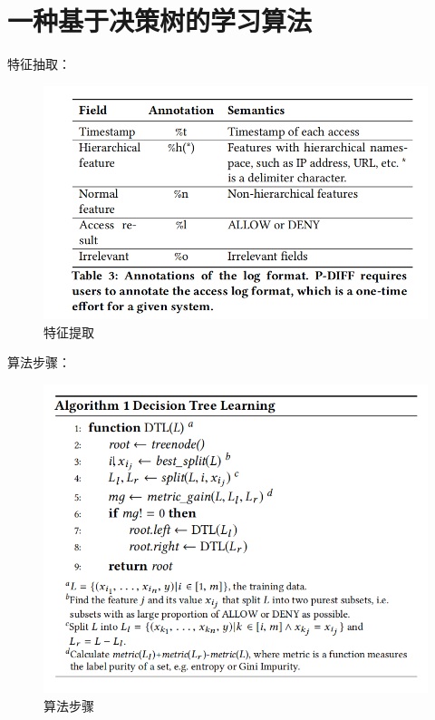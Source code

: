 \documentclass[UTF8]{ctexart}
\begin{document}
	\section{一种基于决策树的学习算法}\label{sec:diwujie}
	特征抽取：
	\begin{figure}[ht]
        \centering
        \includegraphics[scale=0.5]{picture/003.png}
        \caption{特征提取}
        \label{fig:003}
    \end{figure}
    算法步骤：
	\begin{figure}[ht]
        \centering
        \includegraphics[scale=0.5]{picture/004.png}
        \caption{算法步骤}
        \label{fig:004}
    \end{figure}
	\clearpage
\end{document}
